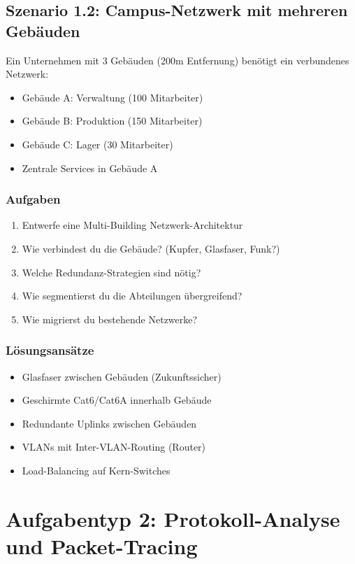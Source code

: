 \documentclass[12pt,a4paper,german]{report}
\begin{document}
\section{Szenario 1.2: Campus-Netzwerk mit mehreren Gebäuden}

Ein Unternehmen mit 3 Gebäuden (200m Entfernung) benötigt ein verbundenes Netzwerk:
\begin{itemize}
    \item Gebäude A: Verwaltung (100 Mitarbeiter)
    \item Gebäude B: Produktion (150 Mitarbeiter)
    \item Gebäude C: Lager (30 Mitarbeiter)
    \item Zentrale Services in Gebäude A
\end{itemize}

\subsection{Aufgaben}
\begin{enumerate}
    \item Entwerfe eine Multi-Building Netzwerk-Architektur
    \item Wie verbindest du die Gebäude? (Kupfer, Glasfaser, Funk?)
    \item Welche Redundanz-Strategien sind nötig?
    \item Wie segmentierst du die Abteilungen übergreifend?
    \item Wie migrierst du bestehende Netzwerke?
\end{enumerate}

\subsection{Lösungsansätze}
\begin{itemize}
    \item Glasfaser zwischen Gebäuden (Zukunftssicher)
    \item Geschirmte Cat6/Cat6A innerhalb Gebäude
    \item Redundante Uplinks zwischen Gebäuden
    \item VLANs mit Inter-VLAN-Routing (Router)
    \item Load-Balancing auf Kern-Switches
\end{itemize}

\chapter{Aufgabentyp 2: Protokoll-Analyse und Packet-Tracing}
\end{document}
